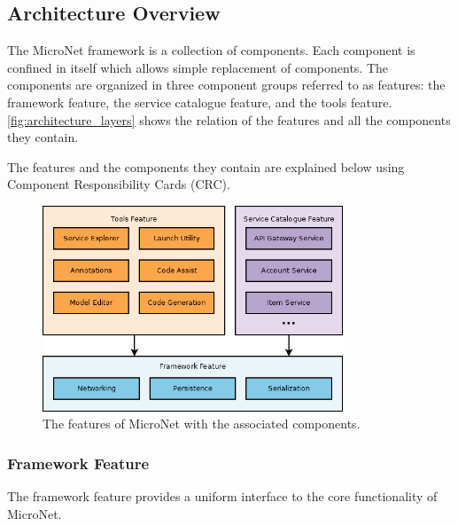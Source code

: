 \subsection{Architecture Overview}

The MicroNet framework is a collection of components. Each component is confined
in itself which allows simple replacement of components. The components are
organized in three component groups referred to as features: the framework
feature, the service catalogue feature, and the tools feature.
\autoref{fig:architecture_layers} shows the relation of the features and all the
components they contain.

The features and the components they contain are explained below using Component
Responsibility Cards (CRC).

\begin{figure}
  \centering
  \includegraphics[width=0.8\textwidth]{images/architecture/ArchitectureLayers}
  \caption{The features of MicroNet with the associated components.}
  \label{fig:architecture_layers}
\end{figure}

\newpage
\subsubsection{Framework Feature}

The framework feature provides a uniform interface to the core functionality of
MicroNet.\\

